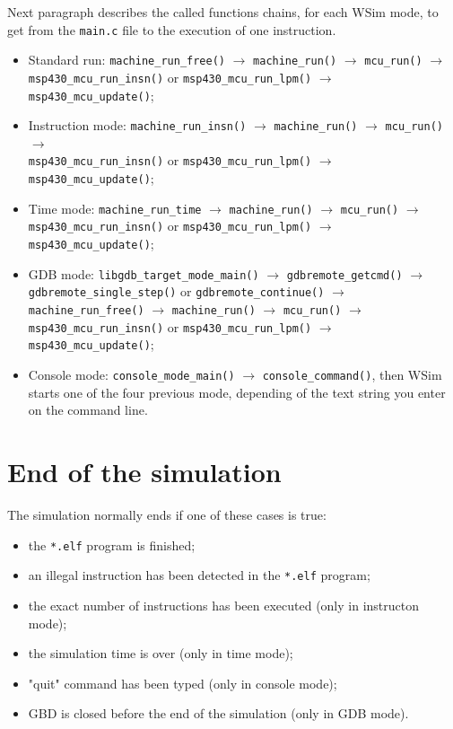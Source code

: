 \documentclass[a4paper,10pt]{report}
\begin{document}
Next paragraph describes the called functions chains, for each WSim mode, to get from the \verb$main.c$ file to the execution of one instruction.
\begin{itemize}
  \item Standard run: \verb$machine_run_free()$ $\longrightarrow$ \verb$machine_run()$ $\longrightarrow$ \verb$mcu_run()$ $\longrightarrow$ \verb$msp430_mcu_run_insn()$ or \verb$msp430_mcu_run_lpm()$ $\longrightarrow$ \verb$msp430_mcu_update()$;
  \item Instruction mode: \verb$machine_run_insn()$ $\longrightarrow$ \verb$machine_run()$ $\longrightarrow$ \verb$mcu_run()$ $\longrightarrow$ \\\verb$msp430_mcu_run_insn()$ or \verb$msp430_mcu_run_lpm()$ $\longrightarrow$ \verb$msp430_mcu_update()$;
  \item Time mode: \verb$machine_run_time$ $\longrightarrow$ \verb$machine_run()$ $\longrightarrow$ \verb$mcu_run()$ $\longrightarrow$ \verb$msp430_mcu_run_insn()$ or \verb$msp430_mcu_run_lpm()$ $\longrightarrow$ \verb$msp430_mcu_update()$;
  \item GDB mode: \verb$libgdb_target_mode_main()$ $\longrightarrow$ \verb$gdbremote_getcmd()$ $\longrightarrow$ \verb$gdbremote_single_step()$ or \verb$gdbremote_continue()$ $\longrightarrow$ \verb$machine_run_free()$ $\longrightarrow$ \verb$machine_run()$ $\longrightarrow$ \verb$mcu_run()$ $\longrightarrow$\\ \verb$msp430_mcu_run_insn()$ or \verb$msp430_mcu_run_lpm()$ $\longrightarrow$ \verb$msp430_mcu_update()$;
  \item Console mode: \verb$console_mode_main()$ $\longrightarrow$ \verb$console_command()$, then WSim starts one of the four previous mode, depending of the text string you enter on the command line.
\end{itemize}

\section{End of the simulation}
The simulation normally ends if one of these cases is true:
\begin{itemize}
  \item the \verb$*.elf$ program is finished;
  \item an illegal instruction has been detected in the \verb$*.elf$ program;
  \item the exact number of instructions has been executed (only in instructon mode);
  \item the simulation time is over (only in time mode);
  \item "quit" command has been typed (only in console mode);
  \item GBD is closed before the end of the simulation (only in GDB mode).
\end{itemize}
\end{document}
